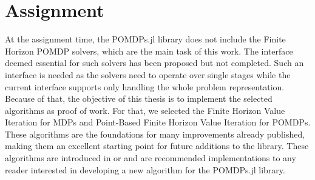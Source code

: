 



\section{Assignment}
At the assignment time, the POMDPs.jl library does not include the Finite Horizon POMDP solvers, which are the main task of this work. The interface deemed essential for such solvers has been proposed but not completed. Such an interface is needed as the solvers need to operate over single stages while the current interface supports only handling the whole problem representation. Because of that, the objective of this thesis is to implement the selected algorithms as proof of work. For that, we selected the Finite Horizon Value Iteration for MDPs and Point-Based Finite Horizon Value Iteration for POMDPs. These algorithms are the foundations for many improvements already published, making them an excellent starting point for future additions to the library. These algorithms are introduced in \cite{Walraven19} or \cite{Shani2013} and are recommended implementations to any reader interested in developing a new algorithm for the POMDPs.jl library. 

